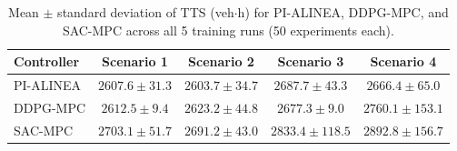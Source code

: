 \begin{table}[htbp]
\centering
\caption{Mean $\pm$ standard deviation of TTS (veh$\cdot$h) for PI-ALINEA, DDPG-MPC, and SAC-MPC across all 5 training runs (50 experiments each).}
\label{tab:tts_multi}
\begin{tabular}{lcccc}
\toprule
Controller & Scenario 1 & Scenario 2 & Scenario 3 & Scenario 4 \\
\midrule
PI-ALINEA & $2607.6 \pm 31.3$ & $2603.7 \pm 34.7$ & $2687.7 \pm 43.3$ & $2666.4 \pm 65.0$ \\
DDPG-MPC & $2612.5 \pm 9.4$ & $2623.2 \pm 44.8$ & $2677.3 \pm 9.0$ & $2760.1 \pm 153.1$ \\
SAC-MPC & $2703.1 \pm 51.7$ & $2691.2 \pm 43.0$ & $2833.4 \pm 118.5$ & $2892.8 \pm 156.7$ \\
\bottomrule
\end{tabular}
\end{table}

